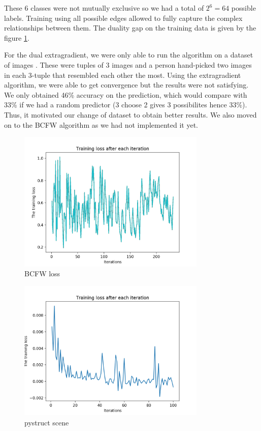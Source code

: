 These 6 classes were not mutually exclusive so we had a total of $2^6=64$
possible labels. Training using all possible edges allowed to fully capture the
complex relationships between them. The duality gap on the training data is
given by the figure \ref{fig:bcfwLoss}.

For the dual extragradient, we were only able to run the algorithm on a dataset
of images \citet{vemulapalliCompactEmbeddingFacial2018}. These were tuples of 3 images and a person
hand-picked two images in each 3-tuple that resembled each other the most. Using the
extragradient algorithm, we were able to get convergence but the results were not 
satisfying. We only obtained 46\% accuracy on the prediction, which would compare 
with 33\% if we had a random predictor (3 choose 2 gives 3  possibilites hence 33\%).
Thus, it motivated our change of dataset to obtain better results. We also moved on to
the BCFW algorithm as we had not implemented it yet.

\begin{figure}[htbp!]
  \center
  \includegraphics[width=0.8\textwidth]{loss_bcfw.png}
  \caption{BCFW loss}
  \label{fig:bcfwLoss}
\end{figure} 
\begin{figure}[htbp!]
  \center
  \includegraphics[width=0.8\textwidth]{pystruct_scene.png}
  \caption{pystruct scene}
  \label{fig:pystruct}
\end{figure} 


